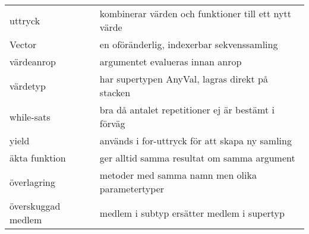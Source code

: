 \begin{tabular}{l|l}
uttryck & kombinerar värden och funktioner till ett nytt värde \\
Vector & en oföränderlig, indexerbar sekvenssamling \\
värdeanrop & argumentet evalueras innan anrop \\
värdetyp & har supertypen AnyVal, lagras direkt på stacken \\
while-sats & bra då antalet repetitioner ej är bestämt i förväg \\
yield & används i for-uttryck för att skapa ny samling \\
äkta funktion & ger alltid samma resultat om samma argument \\
överlagring & metoder med samma namn men olika parametertyper \\
överskuggad medlem & medlem i subtyp ersätter medlem i supertyp \\
\end{tabular}
